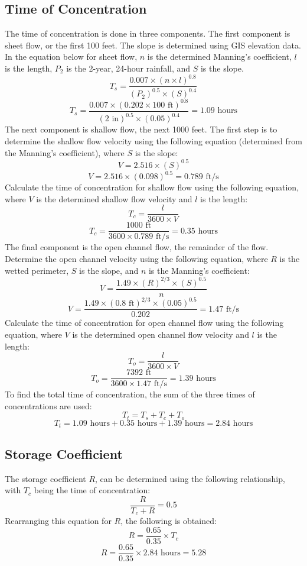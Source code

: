 \documentclass{article}
\begin{document}
\subsection{Time of Concentration}
\noindent The time of concentration is done in three components. The first component is sheet flow, or the first 100 feet. The slope is determined using GIS elevation data. In the equation below for sheet flow, $n$ is the determined Manning's coefficient, $l$ is the length, $P_2$ is the 2-year, 24-hour rainfall, and $S$ is the slope. 
\[T_s=\frac{0.007\times (n\times l)^{0.8}}{(P_2)^{0.5}\times(S)^{0.4}}\]
\[T_s=\frac{0.007\times (0.202\times 100\text{ ft})^{0.8}}{(2\text{ in})^{0.5}\times(0.05)^{0.4}}=1.09\text{ hours}\]
The next component is shallow flow, the next 1000 feet. The first step is to determine the shallow flow velocity using the following equation (determined from the Manning's coefficient), where $S$ is the slope: 
\[V=2.516\times(S)^{0.5}\]
\[V=2.516\times(0.098)^{0.5}=0.789\text{ ft/s}\]
Calculate the time of concentration for shallow flow using the following equation, where $V$ is the determined shallow flow velocity and $l$ is the length: 
\[T_c=\frac{l}{3600\times V}\]
\[T_c=\frac{1000\text{ ft}}{3600\times 0.789\text{ ft/s}}=0.35\text{ hours}\]
The final component is the open channel flow, the remainder of the flow. Determine the open channel velocity using the following equation, where $R$ is the wetted perimeter, $S$ is the slope, and $n$ is the Manning's coefficient: 
\[V=\frac{1.49\times(R)^{2/3}\times(S)^{0.5}}{n}\]
\[V=\frac{1.49\times(0.8\text{ ft})^{2/3}\times(0.05)^{0.5}}{0.202}=1.47\text{ ft/s}\]
Calculate the time of concentration for open channel flow using the following equation, where $V$ is the determined open channel flow velocity and $l$ is the length:
\[T_o=\frac{l}{3600\times V}\] 
\[T_o=\frac{7392\text{ ft}}{3600\times 1.47\text{ ft/s}}=1.39\text{ hours}\]
To find the total time of concentration, the sum of the three times of concentrations are used: 
\[T_t = T_s+T_c+T_o\]
\[T_t =1.09\text{ hours}+0.35\text{ hours}+1.39\text{ hours}=\boxed{2.84\text{ hours}}\]
\subsection{Storage Coefficient}
\noindent The storage coefficient $R$, can be determined using the following relationship, with $T_c$ being the time of concentration: 
\[\frac{R}{T_c+R}=0.5\] 
Rearranging this equation for $R$, the following is obtained:
\[R=\frac{0.65}{0.35}\times T_c\] 
\[R=\frac{0.65}{0.35}\times 2.84\text{ hours}=\boxed{5.28}\] 
\newpage
\end{document}
